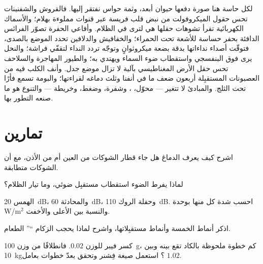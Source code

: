 \begin{remark}\label{rem:b3:sensory-systems:others}
لكل حاسة هنا صورة دفعها حيوان أبعد، وثمة حواس نفتقر إليها.
فالقروش والشفنينات تحس حقول الميكروفولت من نبض قلب فريسة
عبر قنوات مملوءة بهلام؛ والأسماك الكهربائية تقرأ تشوهات
حقلها هي لترى في الظلام. وأفاعي الحفرة تصوّر الفرائس الدافئة
بحفر حساسة للأشعة تحت الحمراء؛ والخفافيش والدلافين تحدد
الموضع بالصدى، فتوقّت أصداء نداءاتها بدقة بضعة ميكروثوانٍ
وتوجّه تردد النداء لتقفّي فراشة؛ والنحل يرى فوق البنفسجي
واستقطاب ضوء السماء ويهتدي به؛ والطيور المهاجرة والسلاحف
تحس حقل الأرض المغناطيسي بآلية لا تزال موضع جدل. وأنف الكلب
فيه من العصبونات المستقبِلة أربعون ضعف ما في أنفنا وثلث
دماغه لقراءتها؛ والبومة تسمع فأرًا تحت الثلج. والمبادئ لا
تتغير --- محوّل، ، وشفرة، وضغط، وخريطة --- والتنوع
هو ما صنعه التطور بها.
\end{remark}

\section{تمارين}

\begin{exercise}[$\star$]\label{exo:b3:sensory-systems:1}
اشرح كيف يعرف الدماغ هل جاء قطار الشوكات من العين أم من
الأذن، مع أن الشوكات متطابقة.
\end{exercise}

\begin{exercise}[$\star$]\label{exo:b3:sensory-systems:2}
لماذا يفرط الضوء استقطاب مستقبِل ضوئي، وما تيار الظلام؟
\end{exercise}

\begin{exercise}[$\star$]\label{exo:b3:sensory-systems:3}
الهمس \qty{20}{dB}، والمحادثة \qty{60}{dB}، وحفلة الروك
\qty{110}{dB}. احسب شدة كل منها بوحدة W/m$^{2}$ والنسبة بين
الأعلى والأخفت.
\end{exercise}

\begin{exercise}[$\star$]\label{exo:b3:sensory-systems:4}
اذكر أنماط  الخمسة وأنماط مستقبِلاتها، واشرح لماذا
يحجب الزكام ``'' الطعام.
\end{exercise}

\begin{exercise}[$\star\star$]\label{exo:b3:sensory-systems:5}
كسر فيبر للوزن $0.02$. فانطلاقًا من وزن \qty{100}{g}، كم
خطوة ملحوظة بالكاد تقع بينه وبين \qty{10}{kg}؟ استعمل صيغة
فِشنر وتحقق بعدّ خطوات بعامل $1.02$.
\end{exercise}

